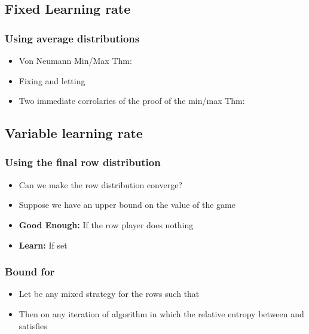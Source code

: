 \documentclass[handout]{beamer}
\begin{document}
\subsection{Fixed Learning rate}
\begin{frame}
\frametitle{Using average distributions}
\begin{itemize}
\item Von Neumann Min/Max Thm: 
\item Fixing  and letting 
\item Two immediate corrolaries of the proof of the min/max Thm:

\end{itemize}
\end{frame}

\subsection{Variable learning rate}
\begin{frame}
\frametitle{Using the final row distribution \R{\lwalgvar}}
\begin{itemize}
\item Can we make the row distribution converge?
\item Suppose we have an upper bound on the value of the game 
\item {\bf Good Enough:} If  the row player does nothing
\item {\bf Learn:} If  set
\end{itemize}
\end{frame}

\begin{frame}
\frametitle{Bound for \R{\lwalgvar}}
\begin{itemize}
\item Let \R{$\Pref$} be any mixed strategy for the rows such that 
\item
  Then on any iteration of algorithm \R{\lwalgvar} in which 
 the relative entropy between \R{$\Pref$} and 
satisfies
\end{itemize}
\end{frame}



\end{document}
